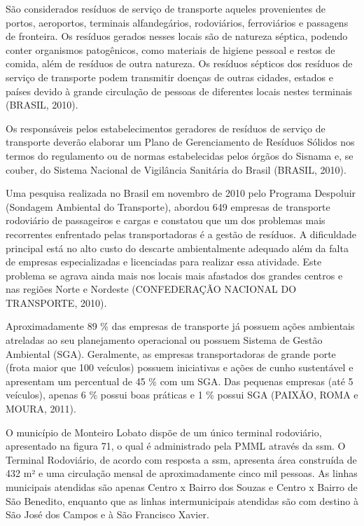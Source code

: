 	São considerados resíduos de serviço de transporte aqueles provenientes de portos, aeroportos, terminais alfandegários, rodoviários, ferroviários e passagens de fronteira. Os resíduos gerados nesses locais são de natureza séptica, podendo conter organismos patogênicos, como materiais de higiene pessoal e restos de comida, além de resíduos de outra natureza. Os resíduos sépticos dos resíduos de serviço de transporte podem transmitir doenças de outras cidades, estados e países devido à grande circulação de pessoas de diferentes locais nestes terminais (BRASIL, 2010).
	
	Os responsáveis pelos estabelecimentos geradores de resíduos de serviço de transporte deverão elaborar um Plano de Gerenciamento de Resíduos Sólidos nos termos do regulamento ou de normas estabelecidas pelos órgãos do Sisnama e, se couber, do Sistema Nacional de Vigilância Sanitária do Brasil (BRASIL, 2010).
	
	Uma pesquisa realizada no Brasil em novembro de 2010 pelo Programa Despoluir (Sondagem Ambiental do Transporte), abordou 649 empresas de transporte rodoviário de passageiros e cargas e constatou que um dos problemas mais recorrentes enfrentado pelas transportadoras é a gestão de resíduos. A dificuldade principal está no alto custo do descarte ambientalmente adequado além da falta de empresas especializadas e licenciadas para realizar essa atividade. Este problema se agrava ainda mais nos locais mais afastados dos grandes centros e nas regiões Norte e Nordeste (CONFEDERAÇÃO NACIONAL DO TRANSPORTE, 2010).
	
	Aproximadamente 89 \% das empresas de transporte já possuem ações ambientais atreladas ao seu planejamento operacional ou possuem Sistema de Gestão Ambiental (SGA). Geralmente, as empresas transportadoras de grande porte (frota maior que 100 veículos) possuem iniciativas e ações de cunho sustentável e apresentam um percentual de 45 \% com um SGA. Das pequenas empresas (até 5 veículos), apenas 6 \% possui boas práticas e 1 \% possui SGA (PAIXÃO, ROMA e MOURA, 2011).
	
	O município de Monteiro Lobato dispõe de um único terminal rodoviário, apresentado na figura 71, o qual é administrado pela PMML através da \gls{ssm}. O Terminal Rodoviário, de acordo com resposta a \gls{ssm}, apresenta área construída de 432 m² e uma circulação mensal de aproximadamente cinco mil pessoas. As linhas municipais atendidas são apenas Centro x Bairro dos Souzas e Centro x Bairro de São Benedito, enquanto que as linhas intermunicipais atendidas são com destino à São José dos Campos e à São Francisco Xavier.
	
